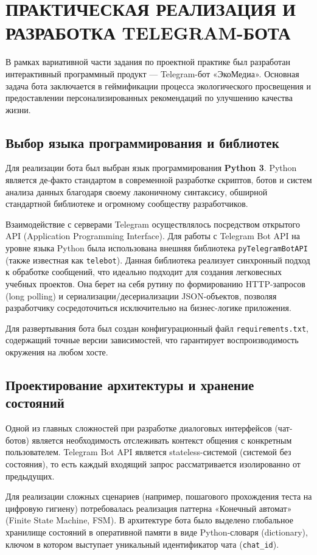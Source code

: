 \section{ПРАКТИЧЕСКАЯ РЕАЛИЗАЦИЯ И РАЗРАБОТКА TELEGRAM-БОТА}

В рамках вариативной части задания по проектной практике был разработан интерактивный программный продукт — Telegram-бот «ЭкоМедиа». Основная задача бота заключается в геймификации процесса экологического просвещения и предоставлении персонализированных рекомендаций по улучшению качества жизни.

\subsection{Выбор языка программирования и библиотек}
Для реализации бота был выбран язык программирования \textbf{Python 3}. Python является де-факто стандартом в современной разработке скриптов, ботов и систем анализа данных благодаря своему лаконичному синтаксису, обширной стандартной библиотеке и огромному сообществу разработчиков.

Взаимодействие с серверами Telegram осуществлялось посредством открытого API (Application Programming Interface). Для работы с Telegram Bot API на уровне языка Python была использована внешняя библиотека \texttt{pyTelegramBotAPI} (также известная как \texttt{telebot}). Данная библиотека реализует синхронный подход к обработке сообщений, что идеально подходит для создания легковесных учебных проектов. Она берет на себя рутину по формированию HTTP-запросов (long polling) и сериализации/десериализации JSON-объектов, позволяя разработчику сосредоточиться исключительно на бизнес-логике приложения.

Для развертывания бота был создан конфигурационный файл \texttt{requirements.txt}, содержащий точные версии зависимостей, что гарантирует воспроизводимость окружения на любом хосте.

\subsection{Проектирование архитектуры и хранение состояний}
Одной из главных сложностей при разработке диалоговых интерфейсов (чат-ботов) является необходимость отслеживать контекст общения с конкретным пользователем. Telegram Bot API является stateless-системой (системой без состояния), то есть каждый входящий запрос рассматривается изолированно от предыдущих.

Для реализации сложных сценариев (например, пошагового прохождения теста на цифровую гигиену) потребовалась реализация паттерна «Конечный автомат» (Finite State Machine, FSM). В архитектуре бота было выделено глобальное хранилище состояний в оперативной памяти в виде Python-словаря (dictionary), ключом в котором выступает уникальный идентификатор чата (\texttt{chat\_id}).

